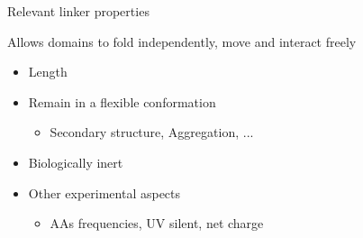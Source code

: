 \documentclass{beamer}
\begin{document}
\begin{frame}{Relevant linker properties}

Allows domains to fold independently, move and interact freely

\begin{itemize}
  \item Length
  \item Remain in a flexible conformation  %
    \begin{itemize}
     \item Secondary structure, Aggregation, ...
    \end{itemize}

  
  \item Biologically inert  %
  \item Other experimental aspects
    \begin{itemize}
     \item AAs frequencies, UV silent, net charge
    \end{itemize}
\end{itemize}


\end{frame}
\end{document}
